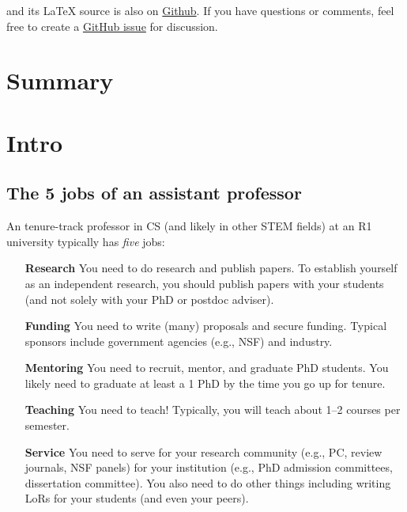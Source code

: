 \documentclass[oneside,11pt,dvipsnames]{book}
\begin{document}
\noindent and its \LaTeX{} source is also on \href{https://github.com/nguyenthanhvuh/phd-cs-us}{Github}. If you have questions or comments, feel free to create a \href{https://github.com/nguyenthanhvuh/phd-cs-us/issues}{GitHub issue} for discussion.

\newpage
\tableofcontents*

\chapter{Summary}\label{sec:summary}
\mainmatter
\chapter{Intro}


\section{The 5 jobs of an assistant professor}
An tenure-track professor in CS (and likely in other STEM fields) at an R1 university typically has \emph{five} jobs:

\begin{enumerate}
\item[\textbf{Research}] You need to do research and publish papers.  To establish yourself as an independent research, you should publish papers with your students (and not solely with your PhD or postdoc adviser).

\item[\textbf{Funding}] You need to write (many) proposals and secure funding. Typical sponsors include government agencies (e.g., NSF) and industry.

\item[\textbf{Mentoring}] You need to recruit, mentor, and graduate PhD students.  You likely need to graduate at least a 1 PhD by the time you go up for tenure.

\item[\textbf{Teaching}] You need to teach! Typically, you will teach about 1--2 courses per semester.

  \item[\textbf{Service}]  You need to serve for your research community (e.g., PC, review journals, NSF panels) for your institution (e.g., PhD admission committees, dissertation committee).  You also need to do other things including writing LoRs for your students (and even your peers).


\end{enumerate}
\end{document}
